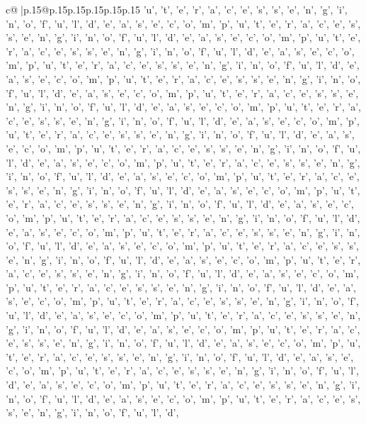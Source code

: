 \documentclass{article}
\begin{document}
{\begin{supertabular}{c@{$\;$}|p{.15\linewidth}@{}p{.15\linewidth}p{.15\linewidth}p{.15\linewidth}p{.15\linewidth}p{.15\linewidth}}
{{{'u', 't', 'e', 'r', 'a', 'c', 'e', 's', 's', 'e', 'n', 'g', 'i', 'n', 'o', 'f', 'u', 'l', 'd', 'e', 'a', 's', 'e', 'c', 'o', 'm', 'p', 'u', 't', 'e', 'r', 'a', 'c', 'e', 's', 's', 'e', 'n', 'g', 'i', 'n', 'o', 'f', 'u', 'l', 'd', 'e', 'a', 's', 'e', 'c', 'o', 'm', 'p', 'u', 't', 'e', 'r', 'a', 'c', 'e', 's', 's', 'e', 'n', 'g', 'i', 'n', 'o', 'f', 'u', 'l', 'd', 'e', 'a', 's', 'e', 'c', 'o', 'm', 'p', 'u', 't', 'e', 'r', 'a', 'c', 'e', 's', 's', 'e', 'n', 'g', 'i', 'n', 'o', 'f', 'u', 'l', 'd', 'e', 'a', 's', 'e', 'c', 'o', 'm', 'p', 'u', 't', 'e', 'r', 'a', 'c', 'e', 's', 's', 'e', 'n', 'g', 'i', 'n', 'o', 'f', 'u', 'l', 'd', 'e', 'a', 's', 'e', 'c', 'o', 'm', 'p', 'u', 't', 'e', 'r', 'a', 'c', 'e', 's', 's', 'e', 'n', 'g', 'i', 'n', 'o', 'f', 'u', 'l', 'd', 'e', 'a', 's', 'e', 'c', 'o', 'm', 'p', 'u', 't', 'e', 'r', 'a', 'c', 'e', 's', 's', 'e', 'n', 'g', 'i', 'n', 'o', 'f', 'u', 'l', 'd', 'e', 'a', 's', 'e', 'c', 'o', 'm', 'p', 'u', 't', 'e', 'r', 'a', 'c', 'e', 's', 's', 'e', 'n', 'g', 'i', 'n', 'o', 'f', 'u', 'l', 'd', 'e', 'a', 's', 'e', 'c', 'o', 'm', 'p', 'u', 't', 'e', 'r', 'a', 'c', 'e', 's', 's', 'e', 'n', 'g', 'i', 'n', 'o', 'f', 'u', 'l', 'd', 'e', 'a', 's', 'e', 'c', 'o', 'm', 'p', 'u', 't', 'e', 'r', 'a', 'c', 'e', 's', 's', 'e', 'n', 'g', 'i', 'n', 'o', 'f', 'u', 'l', 'd', 'e', 'a', 's', 'e', 'c', 'o', 'm', 'p', 'u', 't', 'e', 'r', 'a', 'c', 'e', 's', 's', 'e', 'n', 'g', 'i', 'n', 'o', 'f', 'u', 'l', 'd', 'e', 'a', 's', 'e', 'c', 'o', 'm', 'p', 'u', 't', 'e', 'r', 'a', 'c', 'e', 's', 's', 'e', 'n', 'g', 'i', 'n', 'o', 'f', 'u', 'l', 'd', 'e', 'a', 's', 'e', 'c', 'o', 'm', 'p', 'u', 't', 'e', 'r', 'a', 'c', 'e', 's', 's', 'e', 'n', 'g', 'i', 'n', 'o', 'f', 'u', 'l', 'd', 'e', 'a', 's', 'e', 'c', 'o', 'm', 'p', 'u', 't', 'e', 'r', 'a', 'c', 'e', 's', 's', 'e', 'n', 'g', 'i', 'n', 'o', 'f', 'u', 'l', 'd', 'e', 'a', 's', 'e', 'c', 'o', 'm', 'p', 'u', 't', 'e', 'r', 'a', 'c', 'e', 's', 's', 'e', 'n', 'g', 'i', 'n', 'o', 'f', 'u', 'l', 'd', 'e', 'a', 's', 'e', 'c', 'o', 'm', 'p', 'u', 't', 'e', 'r', 'a', 'c', 'e', 's', 's', 'e', 'n', 'g', 'i', 'n', 'o', 'f', 'u', 'l', 'd', 'e', 'a', 's', 'e', 'c', 'o', 'm', 'p', 'u', 't', 'e', 'r', 'a', 'c', 'e', 's', 's', 'e', 'n', 'g', 'i', 'n', 'o', 'f', 'u', 'l', 'd', 'e', 'a', 's', 'e', 'c', 'o', 'm', 'p', 'u', 't', 'e', 'r', 'a', 'c', 'e', 's', 's', 'e', 'n', 'g', 'i', 'n', 'o', 'f', 'u', 'l', 'd', 'e', 'a', 's', 'e', 'c', 'o', 'm', 'p', 'u', 't', 'e', 'r', 'a', 'c', 'e', 's', 's', 'e', 'n', 'g', 'i', 'n', 'o', 'f', 'u', 'l', 'd', 'e', 'a', 's', 'e', 'c', 'o', 'm', 'p', 'u', 't', 'e', 'r', 'a', 'c', 'e', 's', 's', 'e', 'n', 'g', 'i', 'n', 'o', 'f', 'u', 'l', 'd', 'e', 'a', 's', 'e', 'c', 'o', 'm', 'p', 'u', 't', 'e', 'r', 'a', 'c', 'e', 's', 's', 'e', 'n', 'g', 'i', 'n', 'o', 'f', 'u', 'l', 'd', 'e', 'a', 's', 'e', 'c', 'o', 'm', 'p', 'u', 't', 'e', 'r', 'a', 'c', 'e', 's', 's', 'e', 'n', 'g', 'i', 'n', 'o', 'f', 'u', 'l', 'd', 'e', 'a', 's', 'e', 'c', 'o', 'm', 'p', 'u', 't', 'e', 'r', 'a', 'c', 'e', 's', 's', 'e', 'n', 'g', 'i', 'n', 'o', 'f', 'u', 'l', 'd', 'e', 'a', 's', 'e', 'c', 'o', 'm', 'p', 'u', 't', 'e', 'r', 'a', 'c', 'e', 's', 's', 'e', 'n', 'g', 'i', 'n', 'o', 'f', 'u', 'l', 'd', }}}
\end{supertabular}}
\end{document}
